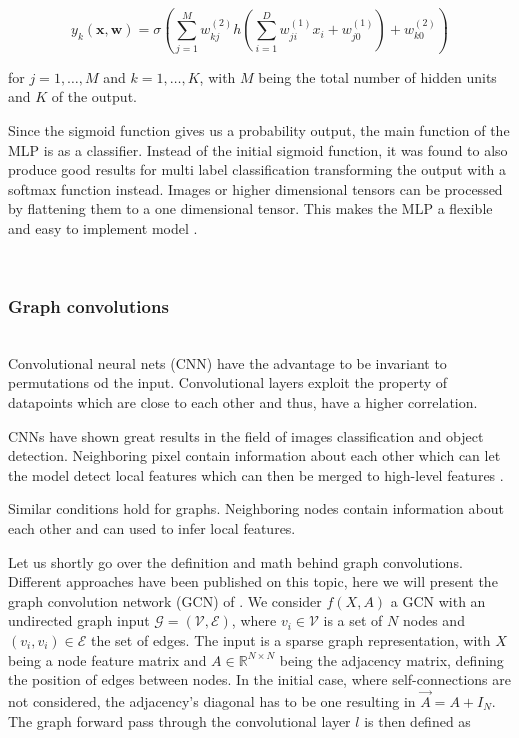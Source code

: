 \begin{equation}
    y_{k}(\mathbf{x}, \mathbf{w})=\sigma\left(\sum_{j=1}^{M} w_{k j}^{(2)} h\left(\sum_{i=1}^{D} w_{j i}^{(1)} x_{i}+w_{j 0}^{(1)}\right)+w_{k 0}^{(2)}\right)
\end{equation}

for $j=1, \ldots, M$ and $k=1, \ldots, K$, with $M$ being the total number of hidden units and $K$ of the output.


Since the sigmoid function gives us a probability output, the main function of the MLP is as a classifier. Instead of the initial sigmoid function, it was found to also produce good results for multi label classification transforming the output with a softmax function instead. Images or higher dimensional tensors can be processed by flattening them to a one dimensional tensor. This makes the MLP a flexible and easy to implement model \cite{bishop2006pattern}.

\\
\subsubsection{Graph convolutions}\\

Convolutional neural nets (CNN) have the advantage to be invariant to permutations od the input. Convolutional layers exploit the property of datapoints which are close to each other and thus, have a higher correlation. 

CNNs have shown great results in the field of images classification and object detection. Neighboring pixel contain information about each other which can let the model detect local features which can then be merged to high-level features \cite{bishop2006pattern}.

Similar conditions hold for graphs. Neighboring nodes contain information about each other and can used to infer local features. 

Let us shortly go over the definition and math behind graph convolutions. Different approaches have been published on this topic, here we will present the graph convolution network (GCN) of \cite{kipf_semi-supervised_2017}.
We consider $f(X,A)$ a GCN with an undirected graph input $\mathcal{G}=(\mathcal{V}, \mathcal{E})$, where $v_{i} \in \mathcal{V}$ is a set of $N$ nodes and  $\left(v_{i}, v_{i}\right) \in \mathcal{E}$ the set of edges. The input is a sparse graph representation, with $X$ being a node feature matrix and $A \in \mathbb{R}^{N \times N}$ being the adjacency matrix, defining the position of edges between nodes. In the initial case, where self-connections are not considered, the adjacency's diagonal has to be one resulting in $\vec{A}=A+I_{N}$. The graph forward pass through the convolutional layer $l$ is then defined as

